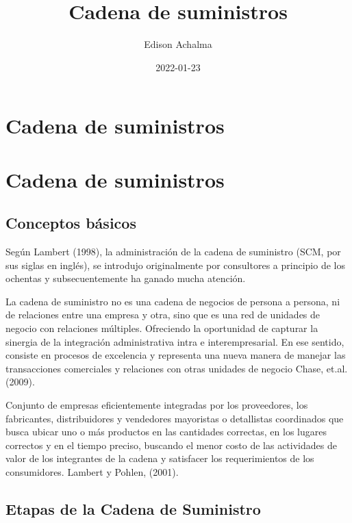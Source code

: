 \documentclass[
  jou,
  floatsintext,
  longtable,
  a4paper,
  nolmodern,
  notxfonts,
  notimes,
  colorlinks=true,linkcolor=blue,citecolor=blue,urlcolor=blue]{apa7}
\title{Cadena de suministros}
\author{Edison Achalma}
\affiliation{
{Economía, Universidad Nacional de San Cristóbal de Huamanga}}
\date{2022-01-23}
\begin{document}
\maketitle

\hypertarget{toc}{}
\tableofcontents
\newpage
\section[Introduction]{Cadena de suministros}

\setcounter{secnumdepth}{-\maxdimen} %

\setlength\LTleft{0pt}


\section{Cadena de suministros}\label{cadena-de-suministros}

\subsection{Conceptos básicos}\label{conceptos-buxe1sicos}

Según Lambert (1998), la administración de la cadena de suministro (SCM,
por sus siglas en inglés), se introdujo originalmente por consultores a
principio de los ochentas y subsecuentemente ha ganado mucha atención.

La cadena de suministro no es una cadena de negocios de persona a
persona, ni de relaciones entre una empresa y otra, sino que es una red
de unidades de negocio con relaciones múltiples. Ofreciendo la
oportunidad de capturar la sinergia de la integración administrativa
intra e interempresarial. En ese sentido, consiste en procesos de
excelencia y representa una nueva manera de manejar las transacciones
comerciales y relaciones con otras unidades de negocio Chase, et.al.
(2009).

Conjunto de empresas eficientemente integradas por los proveedores, los
fabricantes, distribuidores y vendedores mayoristas o detallistas
coordinados que busca ubicar uno o más productos en las cantidades
correctas, en los lugares correctos y en el tiempo preciso, buscando el
menor costo de las actividades de valor de los integrantes de la cadena
y satisfacer los requerimientos de los consumidores. Lambert y Pohlen,
(2001).

\subsection{Etapas de la Cadena de
Suministro}\label{etapas-de-la-cadena-de-suministro}
\end{document}
